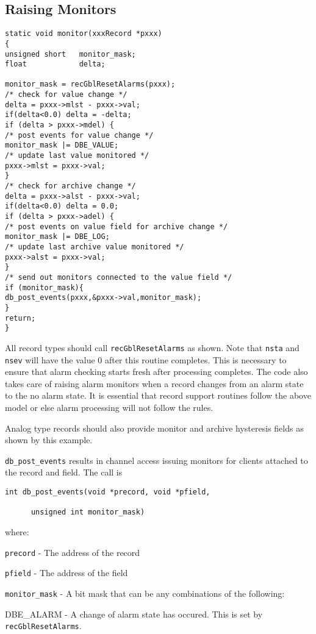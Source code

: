 \subsection{Raising Monitors}

\begin{verbatim}static void monitor(xxxRecord *pxxx)
{
unsigned short   monitor_mask;
float            delta;

monitor_mask = recGblResetAlarms(pxxx);
/* check for value change */
delta = pxxx->mlst - pxxx->val;
if(delta<0.0) delta = -delta;
if (delta > pxxx->mdel) {
/* post events for value change */
monitor_mask |= DBE_VALUE;
/* update last value monitored */
pxxx->mlst = pxxx->val;
}
/* check for archive change */
delta = pxxx->alst - pxxx->val;
if(delta<0.0) delta = 0.0;
if (delta > pxxx->adel) {
/* post events on value field for archive change */
monitor_mask |= DBE_LOG;
/* update last archive value monitored */
pxxx->alst = pxxx->val;
}
/* send out monitors connected to the value field */
if (monitor_mask){
db_post_events(pxxx,&pxxx->val,monitor_mask);
}
return;
}
\end{verbatim}All record types should call \verb|recGblResetAlarms| as shown. Note that \verb|nsta| and \verb|nsev| will have the value 0 after this 
routine completes. This is necessary to ensure that alarm checking starts fresh after processing completes. The code also 
takes care of raising alarm monitors when a record changes from an alarm state to the no alarm state. It is essential that 
record support routines follow the above model or else alarm processing will not follow the rules.

Analog type records should also provide monitor and archive hysteresis fields as shown by this example.

\verb|db_post_events| results in channel access issuing monitors for clients attached to the record and field. The call is

\begin{verbatim}int db_post_events(void *precord, void *pfield,

      unsigned int monitor_mask)
\end{verbatim}

where:

\begin{description}\item \verb|precord| - The address of the record

\item \verb|pfield| - The address of the field

\item \verb|monitor_mask| - A bit mask that can be any combinations of the following:

\end{description}DBE\_ALARM - A change of alarm state has occured. This is set by \verb|recGblResetAlarms|.

